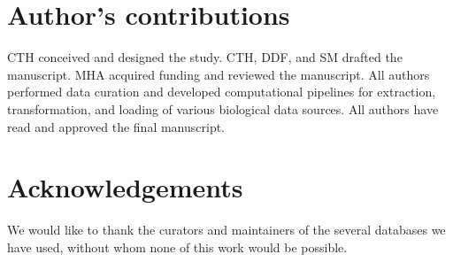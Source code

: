 \documentclass{bmcart}
\begin{document}
\begin{backmatter}
\section*{Author's contributions}
CTH conceived and designed the study.
CTH, DDF, and SM drafted the manuscript.
MHA acquired funding and reviewed the manuscript.
All authors performed data curation and developed computational pipelines for extraction, transformation, and loading of various biological data sources.
All authors have read and approved the final manuscript.

\section*{Acknowledgements}
We would like to thank the curators and maintainers of the several databases we have used, without whom none of this work would be possible.






\end{backmatter}
\end{document}
